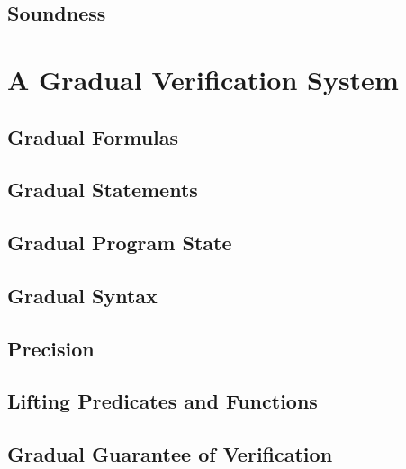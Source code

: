 %    

\subsection{Soundness}
\label{ssec:soundness}


\section{A Gradual Verification System}
\subsection{Gradual Formulas}
\label{sec:gradual-formulas}

\subsection{Gradual Statements}
\label{sec:gradual-statements}

\subsection{Gradual Program State}
\label{sec:gradual-program-state}

\subsection{Gradual Syntax}
\label{sec:cs-gradual-formulas}

\subsection{Precision}
\label{ssec:precision}


\subsection{Lifting Predicates and Functions}
\label{sec:lifting-predicates-and}

\subsection{Gradual Guarantee of Verification}
\label{ssec:gfconclusion}

